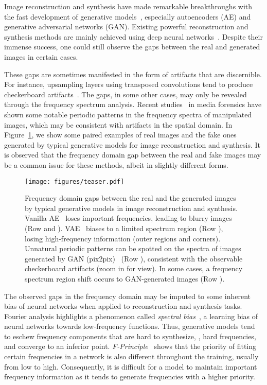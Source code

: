 \documentclass[10pt,twocolumn,letterpaper]{article}
\begin{document}
Image reconstruction and synthesis have made remarkable breakthroughs with the fast development of generative models~\cite{ae,vae,GAN,glow,pixelcnn}, especially autoencoders (AE) and generative adversarial networks (GAN).
Existing powerful reconstruction and synthesis methods are mainly achieved using deep neural networks~\cite{stylegan2,SPADE,alae,nvae}.
Despite their immense success, one could still observe the gaps between the real and generated images in certain cases.
\fi




These gaps are sometimes manifested in the form of artifacts that are discernible. 
For instance, upsampling layers using transposed convolutions tend to produce checkerboard artifacts~\cite{checkerboardarti}. The gaps, in some other cases, may only be revealed through the frequency spectrum analysis. Recent studies~\cite{cnndetection,artifactsganfake,fakeretouch} in media forensics have shown some notable periodic patterns in the frequency spectra of manipulated images, which may be consistent with artifacts in the spatial domain.
In Figure~\ref{fig:teaser}, we show some paired examples of real images and the fake ones generated by typical generative models for image reconstruction and synthesis.
It is observed that the frequency domain gap between the real and fake images may be a common issue for these methods, albeit in slightly different forms.



\begin{figure}[t]
	\centering
\texttt{[image: figures/teaser.pdf]}
\caption{Frequency domain gaps between the real and the generated images by typical generative models in image reconstruction and synthesis. Vanilla AE~\cite{ae} loses important frequencies, leading to blurry images (Row  and ). VAE~\cite{vae} biases to a limited spectrum region (Row ), losing high-frequency information (outer regions and corners). Unnatural periodic patterns can be spotted on the spectra of images generated by GAN (pix2pix)~\cite{pix2pix} (Row ), consistent with the observable checkerboard artifacts (zoom in for view). In some cases, a frequency spectrum region shift occurs to GAN-generated images (Row ).}
	\label{fig:teaser}
	\vspace{-0.4cm}
\end{figure}


The observed gaps in the frequency domain may be imputed to some inherent bias of neural networks when applied to reconstruction and synthesis tasks.
Fourier analysis highlights a phenomenon called \textit{spectral bias}~\cite{spectralbias,nerf,fourierfeatures}, a learning bias of neural networks towards low-frequency functions. Thus, generative models tend to eschew frequency components that are hard to synthesize, \ie, hard frequencies, and converge to an inferior point.
\textit{F-Principle}~\cite{fprinciple} shows that the priority of fitting certain frequencies in a network is also different throughout the training, usually from low to high.
Consequently, it is difficult for a model to maintain important frequency information as it tends to generate frequencies with a higher priority.
\end{document}

